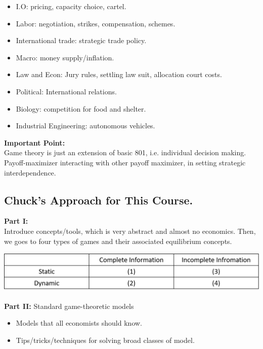 \documentclass[12pt]{article}
\newcommand{\bb}[1]{{\textbf {#1}}}
\begin{document}
\begin{spacing}{1.5}
            \begin{itemize}
                \item I.O: pricing, capacity choice, cartel.
                \item Labor: negotiation, strikes, compensation, schemes.
                \item International trade: strategic trade policy.
                \item Macro: money supply/inflation.
                \item Law and Econ: Jury rules, settling law suit, allocation court costs.
                \item Political: International relations.
                \item Biology: competition for food and shelter.
                \item Industrial Engineering: autonomous vehicles.
            \end{itemize}

            \bb{Important Point:}\\ Game theory is just an extension of basic 801, i.e.
            individual decision making. Payoff-maximizer interacting with other payoff maximizer,
            in setting strategic interdependence.
        
        \subsection{Chuck's Approach for This Course.}

            \bb{Part I:}\\ Introduce concepts/tools, which is very abstract and almost no economics.
            Then, we goes to four types of games and their associated equilibrium concepts.
            
            \begin{center}
                \includegraphics[scale = 0.5]{pic/lecture1/four_types_games.png}
            \end{center}

            \bb{Part II:} Standard game-theoretic models
            
            \begin{itemize}
                \item Models that all economists should know.
                \item Tips/tricks/techniques for solving broad classes of model.
            \end{itemize}


\end{spacing}
\end{document}
